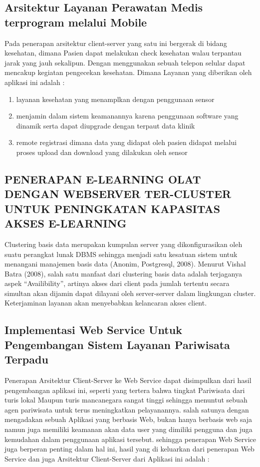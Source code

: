 {\subsection{Arsitektur Layanan Perawatan Medis terprogram melalui Mobile}
Pada penerapan arsitektur client-server yang satu ini bergerak di bidang kesehatan, dimana Pasien dapat melakukan check kesehatan
walau terpantau jarak yang jauh sekalipun. Dengan menggunakan sebuah telepon selular dapat mencakup kegiatan pengecekan kesehatan.
Dimana Layanan yang diberikan oleh aplikasi ini adalah :
\begin{enumerate}
    \item layanan kesehatan yang menamplkan dengan penggunaan sensor
    \item menjamin dalam sistem keamanannya karena penggunaan software yang dinamik serta dapat diupgrade dengan terpaut data klinik
    \item remote registrasi dimana data yang didapat oleh pasien didapat melalui proses upload dan download yang dilakukan oleh sensor
\end{enumerate}

\subsection {PENERAPAN E-LEARNING OLAT DENGAN WEBSERVER TER-CLUSTER UNTUK PENINGKATAN KAPASITAS AKSES E-LEARNING} 
Clustering basis data merupakan kumpulan server yang dikonfigurasikan oleh suatu perangkat lunak DBMS sehingga menjadi satu kesatuan sistem 
untuk menangani manajemen basis data (Anonim, Postgresql, 2008). Menurut Vishal Batra (2008), salah satu manfaat dari clustering basis data 
adalah terjaganya aspek “Availibility”, artinya akses dari client pada jumlah tertentu secara simultan akan dijamin dapat dilayani oleh 
server-server dalam lingkungan cluster. Keterjaminan layanan akan menyebabkan kelancaran akses client.

\subsection {Implementasi Web Service Untuk Pengembangan Sistem Layanan Pariwisata Terpadu}
Penerapan Arsitektur Client-Server ke Web Service dapat disimpulkan dari hasil pengembangan aplikasi ini, seperti yang tertera bahwa tingkat Pariwisata
dari turis lokal Maupun turis mancanegara sangat tinggi sehingga menuntut sebuah agen pariwisata untuk terus meningkatkan pelayanannya. salah satunya dengan
mengadakan sebuah Aplikasi yang berbasis Web, bukan hanya berbasis web saja namun juga memiliki keamanan akan data user yang dimiliki pengguna dan juga kemudahan
dalam penggunaan aplikasi tersebut. sehingga penerapan Web Service juga berperan penting dalam hal ini, hasil yang di keluarkan dari penerapan Web Service dan juga
Arsitektur Client-Server dari Aplikasi ini adalah :

}
